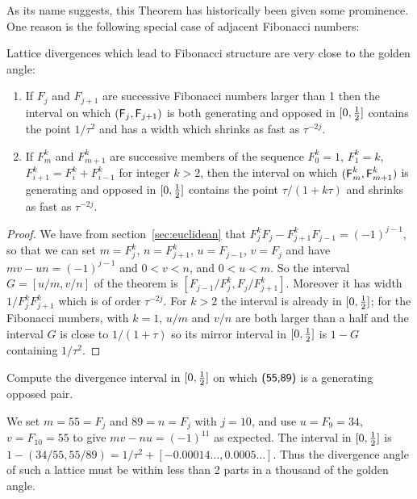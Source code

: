 \clearpage
%
As its name suggests, this Theorem has historically been given some prominence. One reason is the following special case of adjacent Fibonacci numbers:
\begin{theorem}
	Lattice divergences which lead to Fibonacci structure are very close to the golden angle:
	\begin{enumerate}
\item
	If $F_j$ and $F_{j+1}$ are successive Fibonacci numbers larger than 1 then the interval on which $({\textsf F}_j,{\textsf F}_{j+1})$ is both generating and opposed in $[0,\textstyle{\frac{1}{2}}]$  contains the point $1/\tau^2$ and has a width 
	 which shrinks as fast as $\tau^{-2j}$.
\item 
If $F^k_m$ and $F^k_{m+1}$ are successive members of the sequence $F^k_0=1$, $F^k_1=k$, $F^k_{i+1}=F^k_i+F^k_{i-1}$ for integer $k>2$, then 
	the interval on which $({\textsf F}^k_m,{\textsf F}^k_{m+1})$ is generating and opposed in  $[0,\textstyle{\frac{1}{2}}]$ contains the point $\tau/(1+k\tau)$ and shrinks as fast as  $\tau^{-2j}$.
\end{enumerate}
\end{theorem}
\begin{proof}
	We have from section~\ref{sec:euclidean} that $F^{k}_j F_j-F^{k}_{j+1}F_{j-1}=(-1)^{j-1}$, so that we can set $m=F^{k}_j$, $n=F^{k}_{j+1}$, $u=F_{j-1}$, $v=F_{j}$ and have $mv-un=(-1)^{j-1}$ and $0<v<n$, and $0<u<m$. 
	So the interval $G=[u/m,v/n]$ of the theorem is $[F_{j-1}/F^k_{j},F_j/F^k_{j+1}]$.
	Moreover it has width $1/F^k_jF^{k}_{j+1}$ which is of order $\tau^{-2j}$.
	For $k>2$ the interval is already in $[0,\textstyle{\frac{1}{2}}]$; for the Fibonacci numbers, with $k=1$, $u/m$ and $v/n$ are both larger than a half and the interval $G$ is close to $1/(1+\tau)$ so its mirror 
	 interval in $[0,\textstyle{\frac{1}{2}}]$ is  
	$1-G$ containing $1/\tau^2$. 
\end{proof}
\begin{jExercise}
	Compute the divergence interval in $[0,\textstyle{\frac{1}{2}}]$ on which  $\textsf{(55,89)}$ is a generating opposed pair.
\end{jExercise}
\begin{jAnswer}
	We set $m=55=F_j$ and $89=n=F_j$ with $j=10$, and use $u=F_9=34$, $v=F_{10}=55$ to give $mv-nu=(-1)^{11}$ as expected.
	The interval in $[0,\textstyle{\frac{1}{2}}]$ is $1-(34/55,55/89)= 1/\tau^2+ [-0.00014\ldots, 0.0005\ldots]$.
	Thus the divergence angle of such a lattice must be within less than 2 parts in a thousand of the golden angle. 
\end{jAnswer}


